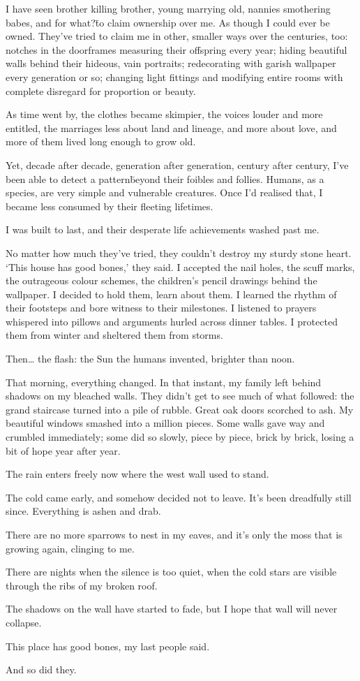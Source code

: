 I have seen brother killing brother, young marrying old, nannies
smothering babes, and for what?\=to claim ownership over me. As though
I could ever be owned. They've tried to claim me in other, smaller
ways over the centuries, too: notches in the doorframes measuring
their offspring every year; hiding beautiful walls behind their
hideous, vain portraits; redecorating with garish wallpaper every
generation or so; changing light fittings and modifying entire rooms
with complete disregard for proportion or beauty.

As time went by, the clothes became skimpier, the voices louder and
more entitled, the marriages less about land and lineage, and more
about love, and more of them lived long enough to grow old.

Yet, decade after decade, generation after generation, century after
century, I've been able to detect a pattern\=beyond their foibles and
follies. Humans, as a species, are very simple and vulnerable
creatures. Once I'd realised that, I became less consumed by their
fleeting lifetimes.

I was built to last, and their desperate life achievements washed past me.

No matter how much they've tried, they couldn't destroy my sturdy
stone heart. `This house has good bones,' they said. I accepted the
nail holes, the scuff marks, the outrageous colour schemes, the
children's pencil drawings behind the wallpaper. I decided to hold
them, learn about them. I learned the rhythm of their footsteps and
bore witness to their milestones. I listened to prayers whispered into
pillows and arguments hurled across dinner tables. I protected them
from winter and sheltered them from storms.

Then… the flash: the Sun the humans invented, brighter than noon.

That morning, everything changed. In that instant, my family left
behind shadows on my bleached walls. They didn't get to see much of
what followed: the grand staircase turned into a pile of rubble. Great
oak doors scorched to ash. My beautiful windows smashed into a million
pieces. Some walls gave way and crumbled immediately; some did so
slowly, piece by piece, brick by brick, losing a bit of hope year
after year.

The rain enters freely now where the west wall used to stand.

The cold came early, and somehow decided not to leave. It's been
dreadfully still since. Everything is ashen and drab.

There are no more sparrows to nest in my eaves, and it's only the moss
that is growing again, clinging to me.

There are nights when the silence is too quiet, when the cold stars
are visible through the ribs of my broken roof.

The shadows on the wall have started to fade, but I hope that wall
will never collapse.

This place has good bones, my last people said.

And so did they.


